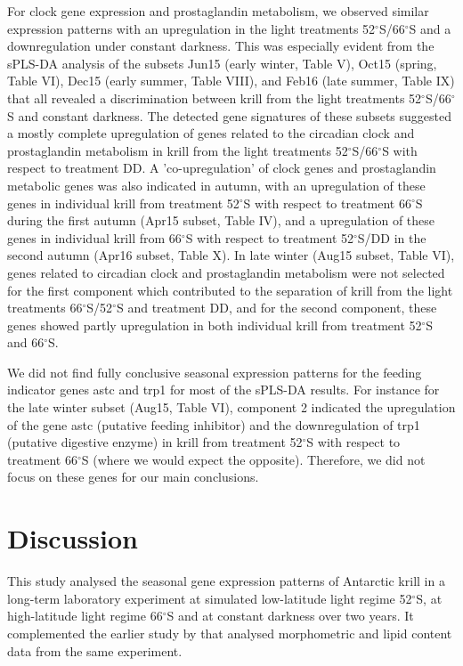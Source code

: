 For clock gene expression and prostaglandin metabolism, we observed similar
expression patterns with an upregulation in the light treatments
52$^{\circ}$S/66$^{\circ}$S and a downregulation under constant darkness. This
was especially evident from the sPLS-DA analysis of the subsets Jun15 (early
winter, Table V), Oct15 (spring, Table VI), Dec15 (early summer, Table VIII),
and Feb16 (late summer, Table IX) that all revealed a discrimination between
krill from the light treatments 52$^{\circ}$S/66$^{\circ}$S and constant
darkness. The detected gene signatures of these subsets suggested a mostly
complete upregulation of genes related to the circadian clock and prostaglandin
metabolism in krill from the light treatments 52$^{\circ}$S/66$^{\circ}$S with
respect to treatment DD. A 'co-upregulation' of clock genes and prostaglandin
metabolic genes was also indicated in autumn, with an upregulation of these
genes in individual krill from treatment 52$^{\circ}$S with respect to treatment
66$^{\circ}$S during the first autumn (Apr15 subset, Table IV), and a
upregulation of these genes in individual krill from 66$^{\circ}$S with respect
to treatment 52$^{\circ}$S/DD in the second autumn (Apr16 subset, Table X). In
late winter (Aug15 subset, Table VI), genes related to circadian clock and
prostaglandin metabolism were not selected for the first component which
contributed to the separation of krill from the light treatments
66$^{\circ}$S/52$^{\circ}$S and treatment DD, and for the second component, these
genes showed partly upregulation in both individual krill from treatment
52$^{\circ}$S and 66$^{\circ}$S.

We did not find fully conclusive seasonal expression patterns for the feeding
indicator genes astc and trp1 for most of the sPLS-DA results. For instance for
the late winter subset (Aug15, Table VI), component 2 indicated the
upregulation of the gene astc (putative feeding inhibitor) and the
downregulation of  trp1 (putative digestive enzyme) in krill from treatment
52$^{\circ}$S with respect to treatment 66$^{\circ}$S (where we would expect the
opposite). Therefore, we did not focus on these genes for our main conclusions. 


\section{Discussion}

This study analysed the seasonal gene expression patterns of Antarctic krill in
a long-term laboratory experiment at simulated low-latitude light regime
52$^{\circ}$S, at high-latitude light regime 66$^{\circ}$S and at constant
darkness over two years. It complemented the earlier study by
\citet{horing_light_2018} that analysed morphometric and lipid content data
from the same experiment.

